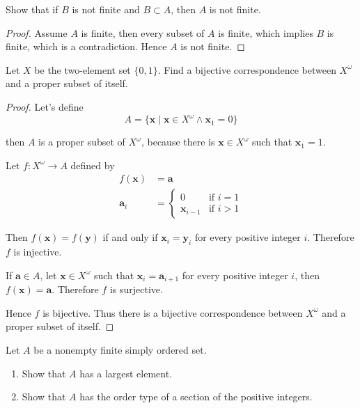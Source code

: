 \begin{exercise}\label{chapter1:section6:exercise2}
    Show that if $B$ is not finite and $B\subset A$, then $A$ is not finite.
\end{exercise}

\begin{proof}
    Assume $A$ is finite, then every subset of $A$ is finite, which implies $B$ is finite, which is a contradiction. Hence $A$ is not finite.
\end{proof}

\begin{exercise}\label{chapter1:section6:exercise3}
    Let $X$ be the two-element set $\{ 0, 1 \}$. Find a bijective correspondence between $X^{\omega}$ and a proper subset of itself.
\end{exercise}

\begin{proof}
    Let's define
    \[
        A = \{ \mathbf{x} \mid \mathbf{x}\in X^{\omega} \land \mathbf{x}_{1} = 0 \}
    \]

    then $A$ is a proper subset of $X^{\omega}$, because there is $\mathbf{x}\in X^{\omega}$ such that $\mathbf{x}_{1} = 1$.

    Let $f: X^{\omega}\to A$ defined by
    \begin{align*}
        f(\mathbf{x})  & = \mathbf{a}                           \\
        \mathbf{a}_{i} & = \begin{cases}
                               0                & \text{if $i = 1$} \\
                               \mathbf{x}_{i-1} & \text{if $i > 1$}
                           \end{cases}
    \end{align*}

    Then $f(\mathbf{x}) = f(\mathbf{y})$ if and only if $\mathbf{x}_{i} = \mathbf{y}_{i}$ for every positive integer $i$. Therefore $f$ is injective.

    If $\mathbf{a}\in A$, let $\mathbf{x}\in X^{\omega}$ such that $\mathbf{x}_{i} = \mathbf{a}_{i+1}$ for every positive integer $i$, then $f(\mathbf{x}) = \mathbf{a}$. Therefore $f$ is surjective.

    Hence $f$ is bijective. Thus there is a bijective correspondence between $X^{\omega}$ and a proper subset of itself.
\end{proof}

\begin{exercise}\label{chapter1:section6:exercise4}
    Let $A$ be a nonempty finite simply ordered set.
    \begin{enumerate}[label={(\alph*)}]
        \item Show that $A$ has a largest element.
        \item Show that $A$ has the order type of a section of the positive integers.
    \end{enumerate}
\end{exercise}

